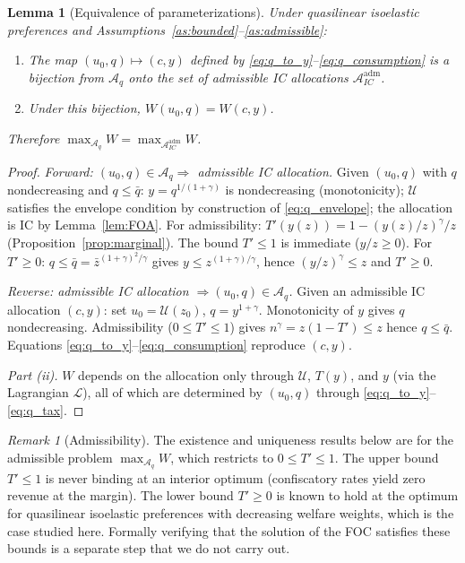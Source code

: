 \documentclass[12pt,a4paper]{article}
\theoremstyle{definition}
\theoremstyle{plain}
\newtheorem{lemma}{Lemma}[section]
\theoremstyle{remark}
\newtheorem{remark}{Remark}[section]
\newcommand{\zbar}{\bar{z}}
\newcommand{\zlow}{z_{\scriptscriptstyle 0}}
\newcommand{\calU}{\mathcal{U}}
\newcommand{\calL}{\mathcal{L}}
\newcommand{\calA}{\mathcal{A}}
\begin{document}
\begin{lemma}[Equivalence of parameterizations]
\label{lem:Aq_equiv}
Under quasilinear isoelastic preferences and
Assumptions~\ref{as:bounded}--\ref{as:admissible}:
\begin{enumerate}[label=(\roman*)]
\item The map $(u_0, q) \mapsto (c, y)$ defined by
  \eqref{eq:q_to_y}--\eqref{eq:q_consumption} is a
  bijection from $\calA_q$ onto the set of admissible
  IC allocations $\calA_{IC}^{\mathrm{adm}}$.
\item Under this bijection, $W(u_0, q) = W(c, y)$.
\end{enumerate}
Therefore $\max_{\calA_q} W = \max_{\calA_{IC}^{\mathrm{adm}}} W$.
\end{lemma}

\begin{proof}
\emph{Forward: $(u_0, q) \in \calA_q \Rightarrow$
admissible IC allocation.}
Given $(u_0, q)$ with $q$ nondecreasing and
$q \leq \bar q$: $y = q^{1/(1+\gamma)}$ is nondecreasing
(monotonicity); $\calU$ satisfies the envelope condition
by construction of \eqref{eq:q_envelope}; the allocation
is IC by Lemma~\ref{lem:FOA}.  For admissibility:
$T'(y(z)) = 1 - (y(z)/z)^\gamma/z$
(Proposition~\ref{prop:marginal}).  The bound $T' \leq 1$
is immediate ($y/z \geq 0$).  For $T' \geq 0$: $q \leq
\bar q = \zbar^{(1+\gamma)^2/\gamma}$ gives
$y \leq z^{(1+\gamma)/\gamma}$, hence
$(y/z)^\gamma \leq z$ and $T' \geq 0$.

\emph{Reverse: admissible IC allocation $\Rightarrow
(u_0, q) \in \calA_q$.}
Given an admissible IC allocation $(c, y)$: set
$u_0 = \calU(\zlow)$, $q = y^{1+\gamma}$.
Monotonicity of $y$ gives $q$ nondecreasing.
Admissibility ($0 \leq T' \leq 1$) gives
$n^\gamma = z(1-T') \leq z$ hence $q \leq \bar q$.
Equations \eqref{eq:q_to_y}--\eqref{eq:q_consumption}
reproduce $(c, y)$.

\emph{Part (ii).}
$W$ depends on the allocation only through $\calU$,
$T(y)$, and $y$ (via the Lagrangian $\calL$), all of
which are determined by $(u_0, q)$ through
\eqref{eq:q_to_y}--\eqref{eq:q_tax}.
\end{proof}

\begin{remark}[Admissibility]
\label{rem:admissibility}
The existence and uniqueness results below are for the
admissible problem $\max_{\calA_q} W$, which restricts
to $0 \leq T' \leq 1$.  The upper bound $T' \leq 1$ is
never binding at an interior optimum (confiscatory rates
yield zero revenue at the margin).  The lower bound
$T' \geq 0$ is known to hold at the optimum for
quasilinear isoelastic preferences with decreasing
welfare weights, which is the case studied here.
Formally verifying that the solution of the FOC satisfies
these bounds is a separate step that we do not carry out.
\end{remark}
\end{document}
